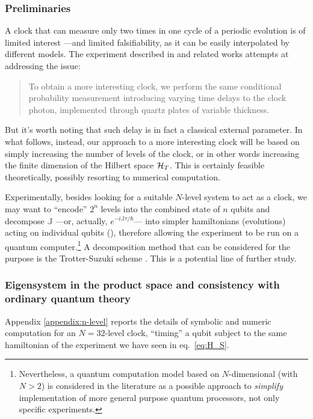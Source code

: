 \subsubsection{Preliminaries}

A clock that can measure only two times in one cycle of a periodic evolution
is of limited interest ---and limited falsifiability, as it can be easily
interpolated by different models.
The experiment described in
\cite{Moreva:synthetic} and related works attempts at addressing the issue:
\begin{quote}
  To obtain a more interesting clock, we perform the same conditional probability measurement
  introducing varying time delays to the clock photon, implemented through quartz plates of
  variable thickness.
\end{quote}
But it's worth noting that such delay is in fact a classical external parameter.
%
In what follows, instead, our approach to a more interesting clock will be based on simply
increasing the number of levels of the clock, or in other words increasing the
finite dimension of the Hilbert space $\mathcal{H}_T$. This is certainly feasible
theoretically, possibly resorting to numerical computation.
\begin{remark}
  Experimentally,
  besides looking for a suitable $N$-level system to act as a clock,
  we may want to ``encode'' $2^{n}$ levels into the combined state of $n$
  qubits and
  decompose $\mathbb{J}$ ---or, actually, $e^{-i\mathbb{J}\tau/\hbar}$---
  into simpler hamiltonians (evolutions)
  acting on individual qubits (),
  therefore allowing the experiment to be run on a quantum computer.\footnote{
    Nevertheless, a quantum computation model based on
    $N$-dimensional 
    (with $N > 2$)
    is considered in the literature \parencite{QuditComp, Qudit}
    as a possible approach to \emph{simplify} implementation
    of more general purpose quantum processors, not only specific experiments.
  }
  A decomposition method that can be considered for the purpose
  is the Trotter-Suzuki scheme
  \parencite{Trotter-Suzuki:exp, Trotter-Suzuki:GPU}.
  This is a potential line of further study.
\end{remark}

\subsubsection{Eigensystem in the product space and consistency with ordinary quantum \mbox{theory}}
\label{sec:building-the-discrete-pw-clock}
Appendix \ref{appendix:n-level} reports the details of
symbolic and
numeric computation for
an $N=32$-level clock, ``timing'' a qubit subject to the same hamiltonian
of the experiment we have seen in eq.~\eqref{eq:H_S}.

